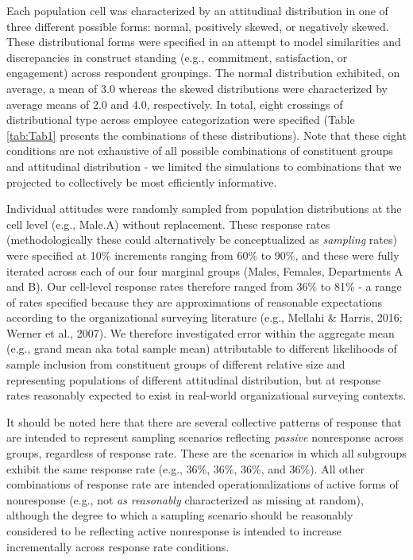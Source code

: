 \documentclass[
  man,mask]{apa7}
\begin{document}
Each population cell was characterized by an attitudinal distribution in one of three different possible forms: normal, positively skewed, or negatively skewed. These distributional forms were specified in an attempt to model similarities and discrepancies in construct standing (e.g., commitment, satisfaction, or engagement) across respondent groupings. The normal distribution exhibited, on average, a mean of 3.0 whereas the skewed distributions were characterized by average means of 2.0 and 4.0, respectively. In total, eight crossings of distributional type across employee categorization were specified (Table \ref{tab:Tab1} presents the combinations of these distributions). Note that these eight conditions are not exhaustive of all possible combinations of constituent groups and attitudinal distribution - we limited the simulations to combinations that we projected to collectively be most efficiently informative.

Individual attitudes were randomly sampled from population distributions at the cell level (e.g., Male.A) without replacement. These response rates (methodologically these could alternatively be conceptualized as \emph{sampling} rates) were specified at 10\% increments ranging from 60\% to 90\%, and these were fully iterated across each of our four marginal groups (Males, Females, Departments A and B). Our cell-level response rates therefore ranged from 36\% to 81\% - a range of rates specified because they are approximations of reasonable expectations according to the organizational surveying literature (e.g., Mellahi \& Harris, 2016; Werner et al., 2007). We therefore investigated error within the aggregate mean (e.g., grand mean aka total sample mean) attributable to different likelihoods of sample inclusion from constituent groups of different relative size and representing populations of different attitudinal distribution, but at response rates reasonably expected to exist in real-world organizational surveying contexts.

It should be noted here that there are several collective patterns of response that are intended to represent sampling scenarios reflecting \emph{passive} nonresponse across groups, regardless of response rate. These are the scenarios in which all subgroups exhibit the same response rate (e.g., 36\%, 36\%, 36\%, and 36\%). All other combinations of response rate are intended operationalizations of active forms of nonresponse (e.g., not \emph{as reasonably} characterized as missing at random), although the degree to which a sampling scenario should be reasonably considered to be reflecting active nonresponse is intended to increase incrementally across response rate conditions.
\end{document}
